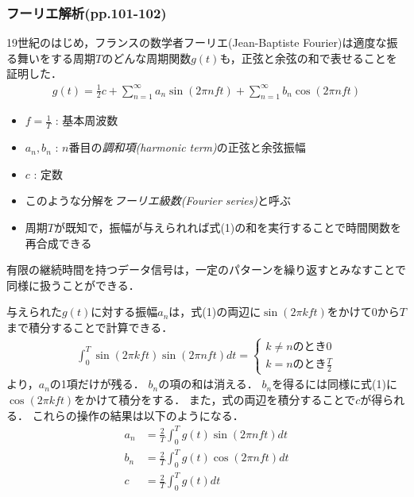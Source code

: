 \documentclass[a4paper]{ltjsarticle}
\begin{document}
		\subsubsection{フーリエ解析(pp.101-102)}
			19世紀のはじめ，フランスの数学者フーリエ(Jean-Baptiste Fourier)は適度な振る舞いをする周期$T$のどんな周期関数$g(t)$も，正弦と余弦の和で表せることを証明した．
			\begin{align}
				g(t) = \frac{1}{2}c + \sum^{\infty}_{n=1} a_n \sin(2\pi nft) + \sum^{\infty}_{n=1} b_n \cos(2\pi nft)
			\end{align}
			\begin{itemize}
				\item $f=\frac{1}{T}$ : 基本周波数
				\item $a_n,b_n$ : $n$番目の\emph{調和項(harmonic term)}の正弦と余弦振幅
				\item $c$ : 定数
				\item このような分解を\emph{フーリエ級数(Fourier series)}と呼ぶ
				\item 周期$T$が既知で，振幅が与えられれば式(1)の和を実行することで時間関数を再合成できる
			\end{itemize}
			有限の継続時間を持つデータ信号は，一定のパターンを繰り返すとみなすことで同様に扱うことができる．\par
			与えられた$g(t)$に対する振幅$a_n$は，式(1)の両辺に$\sin(2\pi kft)$をかけて$0$から$T$まで積分することで計算できる．
			\begin{align}
				\int^T_0 \sin(2\pi kft) \sin(2\pi nft) dt =
				\begin{cases}
					k \neq n \text{のとき} 0 \\
					k = n \text{のとき} \frac{T}{2}
				\end{cases}
			\end{align}
			より，$a_n$の1項だけが残る．
			$b_n$の項の和は消える．
			$b_n$を得るには同様に式(1)に$\cos(2\pi kft)$をかけて積分をする．
			また，式の両辺を積分することで$c$が得られる．
			これらの操作の結果は以下のようになる．
			\begin{align}
				a_n &= \frac{2}{T} \int^T_0 g(t) \sin(2\pi nft)dt \\
				b_n &= \frac{2}{T} \int^T_0 g(t) \cos(2\pi nft)dt \\
				c &= \frac{2}{T} \int^T_0 g(t) dt
			\end{align}
\end{document}
